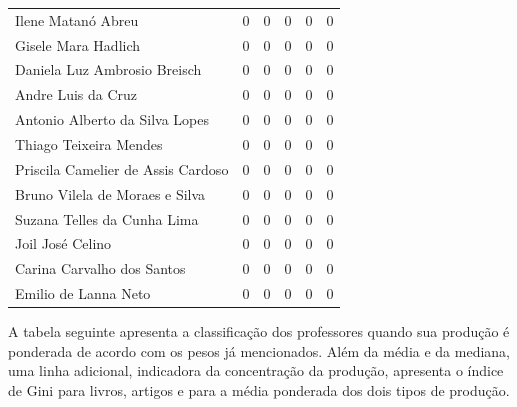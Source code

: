 \documentclass[12pt,brazil]{article}\usepackage[]{graphicx}\usepackage[]{xcolor}
\newcounter{tabela}
\begin{document}
\begin{longtable}{lrrrrr}
Ilene Matanó Abreu & 0 & 0 & 0 & 0 & 0 \\
Gisele Mara Hadlich & 0 & 0 & 0 & 0 & 0 \\
Daniela Luz Ambrosio Breisch & 0 & 0 & 0 & 0 & 0 \\
Andre Luis da Cruz & 0 & 0 & 0 & 0 & 0 \\
Antonio Alberto da Silva Lopes & 0 & 0 & 0 & 0 & 0 \\
Thiago Teixeira Mendes & 0 & 0 & 0 & 0 & 0 \\
Priscila Camelier de Assis Cardoso & 0 & 0 & 0 & 0 & 0 \\
Bruno Vilela de Moraes e Silva & 0 & 0 & 0 & 0 & 0 \\
Suzana Telles da Cunha Lima & 0 & 0 & 0 & 0 & 0 \\
Joil José Celino & 0 & 0 & 0 & 0 & 0 \\
\hline Carina Carvalho dos Santos & 0 & 0 & 0 & 0 & 0 \\
Emilio de Lanna Neto & 0 & 0 & 0 & 0 & 0 \\
\end{longtable}


\clearpage

A tabela seguinte apresenta a classificação dos professores quando sua
produção é ponderada de acordo com os pesos já mencionados. Além da média e da
mediana, uma linha adicional, indicadora da concentração da produção,
apresenta o índice de Gini para livros, artigos e para a média ponderada dos
dois tipos de produção.
\end{document}
